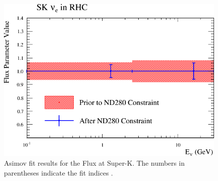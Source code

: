 \begin{figure}
\begin{centering}
{\begin{centering}
\includegraphics[height=0.195\textheight]{Chapters/Figures/Validation/Asimov/sk_nf_nue_flux_parms}
\par\end{centering}
}
\par\end{centering}
\caption[Asimov Fit Results for the Flux at Super-K]{Asimov fit results for the Flux at Super-K. The numbers in parentheses
indicate the fit indices . \label{fig:Asimov-fit-resultsSKFHC} }
\end{figure}

